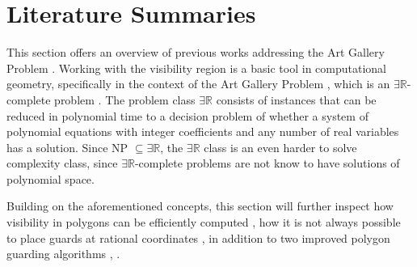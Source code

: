 \section{Literature Summaries}
\label{sec:literature}

This section offers an overview of previous works addressing the Art Gallery Problem \cite{o1987art}. 
Working with the visibility region is a basic tool in computational geometry, specifically in the context of the Art Gallery Problem \cite{o1987art}, which is an $\exists \mathbb R$-complete problem \cite{abrahamsen2021art}. The problem class $\exists \mathbb R$ consists of instances that can be reduced in polynomial time to a decision problem of whether a system of polynomial equations with integer coefficients and any number of real variables has a solution. Since NP $\subseteq \exists \mathbb R$, the $\exists \mathbb R$ class is an even harder to solve complexity class, since $\exists \mathbb R$-complete problems are not know to have solutions of polynomial space. 

Building on the aforementioned concepts, this section will further inspect how visibility in polygons can be efficiently computed \cite{DBLP:journals/corr/BungiuHHHK14}, how it is not always possible to place guards at rational coordinates \cite{abrahamsen2021art}, in addition to two improved polygon guarding algorithms \cite{maleki2022implementation}, \cite{DBLP:journals/corr/abs-2007-06920}.





\newpage

